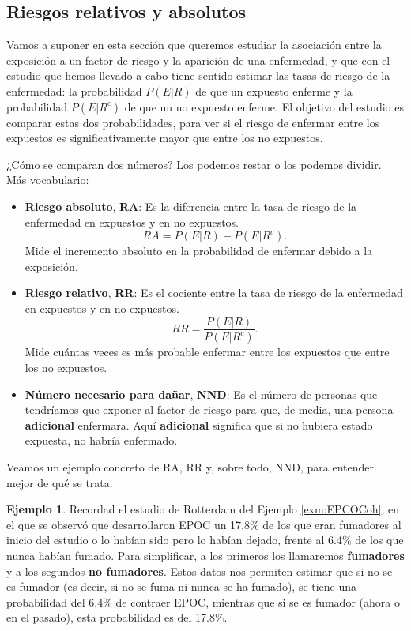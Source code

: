 \documentclass[
]{book}
\theoremstyle{definition}
\theoremstyle{definition}
\newtheorem{example}{Ejemplo}[chapter]
\theoremstyle{definition}
\theoremstyle{definition}
\theoremstyle{remark}
\begin{document}
\hypertarget{sec:riesgosRR}{%
\subsection{Riesgos relativos y absolutos}\label{sec:riesgosRR}}

Vamos a suponer en esta sección que queremos estudiar la asociación entre la exposición a un factor de riesgo y la aparición de una enfermedad, y que con el estudio que hemos llevado a cabo tiene sentido estimar las tasas de riesgo de la enfermedad: la probabilidad \(P(E|R)\) de que un expuesto enferme y la probabilidad \(P(E|R^c)\) de que un no expuesto enferme. El objetivo del estudio es comparar estas dos probabilidades, para ver si el riesgo de enfermar entre los expuestos es significativamente mayor que entre los no expuestos.

¿Cómo se comparan dos números? Los podemos restar o los podemos dividir. Más vocabulario:

\begin{itemize}
\item
  \textbf{Riesgo absoluto}, \textbf{RA}: Es la diferencia entre la tasa de riesgo de la enfermedad en expuestos y en no expuestos.\\
  \[
  RA=P(E|R)-P(E|R^c).
  \]
  Mide el incremento absoluto en la probabilidad de enfermar debido a la exposición.
\item
  \textbf{Riesgo relativo}, \textbf{RR}: Es el cociente entre la tasa de riesgo de la enfermedad en expuestos y en no expuestos.
  \[
  RR=\dfrac{P(E|R)}{P(E|R^c)}.
  \]
  Mide cuántas veces es más probable enfermar entre los expuestos que entre los no expuestos.
\item
  \textbf{Número necesario para dañar}, \textbf{NND}: Es el número de personas que tendríamos que exponer al factor de riesgo para que, de media, una persona \textbf{adicional} enfermara. Aquí \textbf{adicional} significa que si no hubiera estado expuesta, no habría enfermado.
\end{itemize}

Veamos un ejemplo concreto de RA, RR y, sobre todo, NND, para entender mejor de qué se trata.

\begin{example}
\protect\hypertarget{exm:IBScohorte2}{}\label{exm:IBScohorte2}Recordad el estudio de Rotterdam del Ejemplo \ref{exm:EPCOCoh}, en el que se observó que desarrollaron EPOC un 17.8\% de los que eran fumadores al inicio del estudio o lo habían sido pero lo habían dejado, frente al 6.4\% de los que nunca habían fumado. Para simplificar, a los primeros los llamaremos \textbf{fumadores} y a los segundos \textbf{no fumadores}. Estos datos nos permiten estimar que si no se es fumador (es decir, si no se fuma ni nunca se ha fumado), se tiene una probabilidad del 6.4\% de contraer EPOC, mientras que si se es fumador (ahora o en el pasado), esta probabilidad es del 17.8\%.
\end{example}
\end{document}
